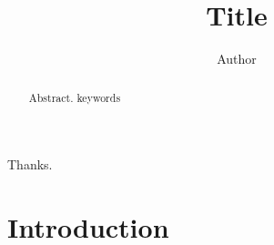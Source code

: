 \documentclass{kaumasters} %
\title{Title}
\author{Author}
\institute{Department of Mathematics and Computer Science}
\begin{document}
\frontmatter
\begin{abstract}
  Abstract.
  \keywords keywords
\end{abstract}
\approvalpage%
\begin{acknowledgements}
  Thanks.
\end{acknowledgements}
\tableofcontents
\mainmatter
\section{Introduction}
\end{document}

